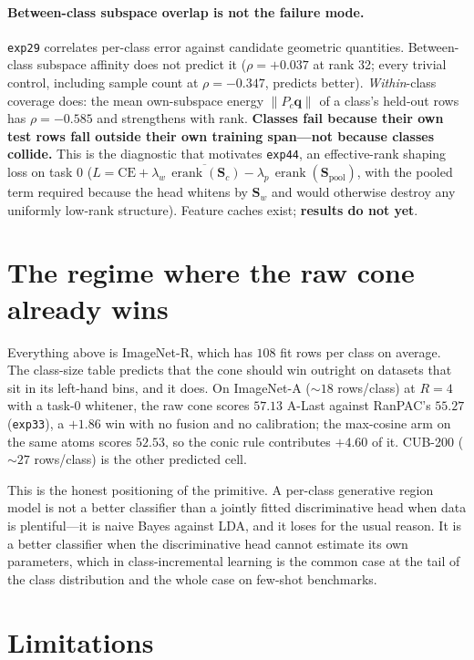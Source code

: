 \documentclass[10pt,twocolumn]{article}
\newcommand{\erank}{\operatorname{erank}}
\newcommand{\bq}{\mathbf{q}}
\newcommand{\bS}{\mathbf{S}}
\begin{document}
\paragraph{Between-class subspace overlap is not the failure mode.}
\texttt{exp29} correlates per-class error against candidate geometric
quantities. Between-class subspace affinity does not predict it
($\rho={+}0.037$ at rank 32; every trivial control, including sample count at
$\rho={-}0.347$, predicts better). \emph{Within}-class coverage does: the mean
own-subspace energy $\lVert P_c\bq\rVert$ of a class's held-out rows has
$\rho={-}0.585$ and strengthens with rank. \textbf{Classes fail because their
own test rows fall outside their own training span---not because classes
collide.} This is the diagnostic that motivates \texttt{exp44}, an effective-rank
shaping loss on task 0 ($L=\mathrm{CE}+\lambda_w\,\overline{\erank(\bS_c)}
-\lambda_p\,\erank(\bS_{\text{pool}})$, with the pooled term required because
the head whitens by $\bS_w$ and would otherwise destroy any uniformly low-rank
structure). Feature caches exist; \textbf{results do not yet}.

\section{The regime where the raw cone already wins}

Everything above is ImageNet-R, which has $108$ fit rows per class on average.
The class-size table predicts that the cone should win outright on datasets that
sit in its left-hand bins, and it does. On ImageNet-A ($\sim18$ rows/class) at
$R{=}4$ with a task-0 whitener, the raw cone scores $57.13$ A-Last against
RanPAC's $55.27$ (\texttt{exp33}), a $+1.86$ win with no fusion and no
calibration; the max-cosine arm on the same atoms scores $52.53$, so the conic
rule contributes $+4.60$ of it. CUB-200 ($\sim27$ rows/class) is the other
predicted cell.

This is the honest positioning of the primitive. A per-class generative region
model is not a better classifier than a jointly fitted discriminative head when
data is plentiful---it is naive Bayes against LDA, and it loses for the usual
reason. It is a better classifier when the discriminative head cannot estimate
its own parameters, which in class-incremental learning is the common case at
the tail of the class distribution and the whole case on few-shot benchmarks.

\section{Limitations}
\label{sec:limits}
\end{document}
